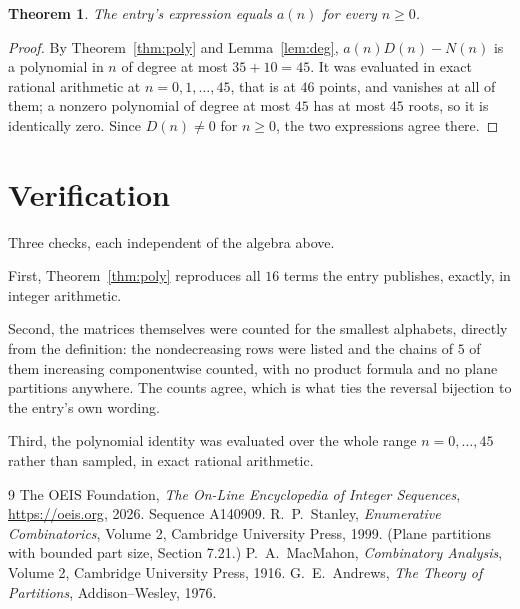 \documentclass[11pt,a4paper]{article}
\theoremstyle{plain}
\newtheorem{theorem}{Theorem}
\theoremstyle{definition}
\begin{document}
\begin{theorem}
The entry's expression equals $a(n)$ for every $n\ge0$.
\end{theorem}

\begin{proof}
By Theorem~\ref{thm:poly} and Lemma~\ref{lem:deg}, $a(n)D(n)-N(n)$ is a polynomial in $n$
of degree at most $35+10=45$. It was evaluated in exact rational arithmetic at
$n=0,1,\dots,45$, that is at $46$ points, and vanishes at all of them; a nonzero polynomial
of degree at most $45$ has at most $45$ roots, so it is identically zero. Since $D(n)\neq0$
for $n\ge0$, the two expressions agree there.
\end{proof}

\section{Verification}

Three checks, each independent of the algebra above.

First, Theorem~\ref{thm:poly} reproduces all $16$ terms the entry publishes,
exactly, in integer arithmetic.

Second, the matrices themselves were counted for the smallest alphabets, directly from the
definition: the nondecreasing rows were listed and the chains of $5$ of them increasing
componentwise counted, with no product formula and no plane partitions anywhere. The counts
agree, which is what ties the reversal bijection to the entry's own wording.

Third, the polynomial identity was evaluated over the whole range $n=0,\dots,45$ rather than
sampled, in exact rational arithmetic.

\begin{thebibliography}{9}
 The OEIS Foundation, \emph{The On-Line Encyclopedia of Integer
Sequences}, \url{https://oeis.org}, 2026. Sequence A140909.
 R.~P.~Stanley, \emph{Enumerative Combinatorics}, Volume 2, Cambridge
University Press, 1999. (Plane partitions with bounded part size, Section 7.21.)
 P.~A.~MacMahon, \emph{Combinatory Analysis}, Volume 2, Cambridge
University Press, 1916.
 G.~E.~Andrews, \emph{The Theory of Partitions}, Addison--Wesley, 1976.
\end{thebibliography}
\end{document}
